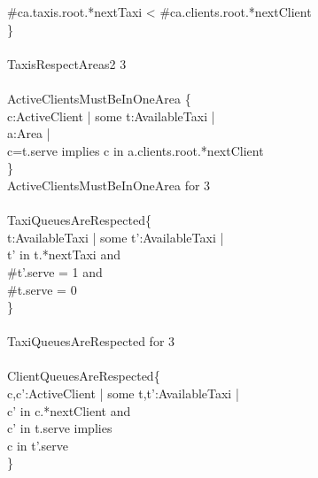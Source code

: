 	\qquad \-\qquad \#ca.taxis.root.*nextTaxi < \#ca.clients.root.*nextClient\\
	\qquad \}\\
	\qquad \\
	 TaxisRespectAreas2  3\\
	\qquad \\
	 ActiveClientsMustBeInOneArea \{\\
	\qquad \- c:ActiveClient | {\color{blue}some} t:AvailableTaxi | \\
	\qquad \- a:Area | \\
	\qquad \-\qquad c=t.serve {\color{blue}implies} c {\color{blue}in} a.clients.root.*nextClient\\
	\qquad \}\\
	 ActiveClientsMustBeInOneArea {\color{blue}for} 3\\
	\qquad \\
	 TaxiQueuesAreRespected\{\\
	\qquad \- t:AvailableTaxi | {\color{blue}some} t':AvailableTaxi | \\
	\qquad \-\qquad t' {\color{blue}in} t.*nextTaxi and\\
	\qquad \-\qquad \#t'.serve = 1 \qquad and\\
	\qquad \-\qquad \#t.serve = 0 \qquad \\
	\qquad \}\\
	\qquad \\
	 TaxiQueuesAreRespected {\color{blue}for} 3\\
	\qquad \\
	 ClientQueuesAreRespected\{\\
	\qquad \- c,c':ActiveClient | {\color{blue}some} t,t':AvailableTaxi | \\
	\qquad \-\qquad c' {\color{blue}in} c.*nextClient and\\
	\qquad \-\qquad c' {\color{blue}in} t.serve implies\\
	\qquad \-\qquad c {\color{blue}in} t'.serve\\
	\qquad \}\\
